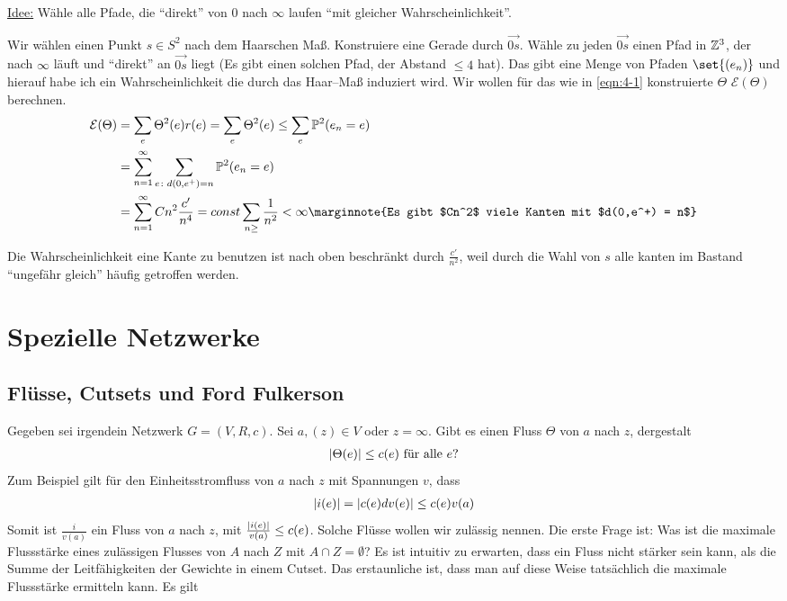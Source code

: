 \begin{beweis}
	\underline{Idee:} Wähle alle Pfade, die \enquote{direkt} von $0$ nach $\infty$ laufen \enquote{mit gleicher Wahrscheinlichkeit}.
	
	Wir wählen einen Punkt $s \in S^2$ nach dem Haarschen Maß. Konstruiere eine Gerade durch $\overrightarrow{0s}$. Wähle zu jeden $\overrightarrow{0s}$ einen Pfad in $\mathbb{Z}^3$, der nach $\infty$ läuft und \enquote{direkt} an $\overrightarrow{0s}$ liegt (Es gibt einen solchen Pfad, der Abstand $\leq 4$ hat). 
	Das gibt eine Menge von Pfaden $\set{(e_n)}$ und hierauf habe ich ein Wahrscheinlichkeit die durch das Haar--Maß induziert wird. Wir wollen für das wie in \eqref{eqn:4-1} konstruierte $\Theta$ $\mathcal{E}(\Theta)$ berechnen.
	\begin{align}
		\mathcal{E}(\Theta) &= \sum\limits_{e} \Theta^2(e) r(e) = \sum\limits_{e}\Theta^2(e) \leq \sum\limits_{e} \prop{e_n=e}[2] \\
							&= \sum\limits_{n=1}^{\infty} \sum\limits_{e\colon d(0,e^+) = n}\prop{e_n = e}[2] \\
							&= \sum\limits_{n = 1}^{\infty}Cn^2\frac{c'}{n^4} = const \sum\limits_{n \geq} \frac{1}{n^2} < \infty \marginnote{Es gibt $Cn^2$ viele Kanten mit $d(0,e^+) = n$} 
	\end{align}
	
	Die Wahrscheinlichkeit eine Kante zu benutzen ist nach oben beschränkt durch $\frac{c'}{n^2}$, weil durch die Wahl von $s$ alle kanten im Bastand \enquote{ungefähr gleich} häufig getroffen werden.
	
\end{beweis}

\chapter{Spezielle Netzwerke}
\label{chap:SpezielleNetzwerke}
\section{Flüsse, Cutsets und Ford Fulkerson}
Gegeben sei irgendein Netzwerk $G = (V,R,c).$ Sei $a,(z) \in V$ oder $z = \infty$. Gibt es einen Fluss $\Theta$ von $a$ nach $z$, dergestalt
\begin{gather}
	\lvert\Theta(e)\rvert \leq c(e)  \text{ für alle } e?
\end{gather}
Zum Beispiel gilt für den Einheitsstromfluss von $a$ nach $z$ mit Spannungen $v$, dass 
\begin{align}
	\lvert i(e)\rvert = \lvert c(e) dv(e)\rvert \leq c(e)v(a)
\end{align}
Somit ist $\frac{i}{v(a)}$ ein Fluss von $a$ nach $z$, mit $\frac{\lvert i(e)\rvert}{v(a)} \leq c(e)$. Solche Flüsse wollen wir zulässig nennen.
Die erste Frage ist: Was ist die maximale Flussstärke eines zulässigen Flusses von $A$ nach $Z$ mit $A \cap Z = \emptyset$?
Es ist intuitiv zu erwarten, dass ein Fluss nicht stärker sein kann, als die Summe der Leitfähigkeiten der Gewichte in einem Cutset.  Das erstaunliche ist, dass man auf diese Weise tatsächlich die maximale Flussstärke ermitteln kann. Es gilt

